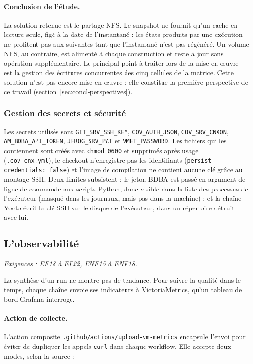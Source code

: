 \paragraph{Conclusion de l'étude.} La solution retenue est le partage NFS. Le
snapshot ne fournit qu'un cache en lecture seule, figé à la date de
l'instantané : les états produits par une exécution ne profitent pas aux
suivantes tant que l'instantané n'est pas régénéré. Un volume NFS, au contraire,
est alimenté à chaque construction et reste à jour sans opération
supplémentaire. Le principal point à traiter lors de la mise en œuvre est la
gestion des écritures concurrentes des cinq cellules de la matrice. Cette
solution n'est pas encore mise en œuvre ; elle constitue la première perspective
de ce travail (section~\ref{sec:concl-perspectives}).

\subsubsection{Gestion des secrets et sécurité}

Les secrets utilisés sont \texttt{GIT\_SRV\_SSH\_KEY}, \texttt{COV\_AUTH\_JSON},
\texttt{COV\_SRV\_CNXON}, \texttt{AM\_BDBA\_API\_TOKEN}, \texttt{JFROG\_SRV\_PAT} et
\texttt{VMET\_PASSWORD}. Les fichiers qui les contiennent sont créés avec
\texttt{chmod 0600} et supprimés après usage (\texttt{.cov\_cnx.yml}), le
checkout n'enregistre pas les identifiants (\texttt{persist-credentials: false})
et l'image de compilation ne contient aucune clé grâce au montage SSH. Deux
limites subsistent : le jeton BDBA est passé en argument de ligne de commande
aux scripts Python, donc visible dans la liste des processus de l'exécuteur
(masqué dans les journaux, mais pas dans la machine) ; et la chaîne Yocto écrit
la clé SSH sur le disque de l'exécuteur, dans un répertoire détruit avec lui.

\subsection{L'observabilité}
\label{ssec:impl-observabilite}

\emph{Exigences : EF18 à EF22, ENF15 à ENF18.}

La synthèse d'un run ne montre pas de tendance. Pour suivre la qualité dans le
temps, chaque chaîne envoie ses indicateurs à VictoriaMetrics, qu'un tableau de
bord Grafana interroge.

\paragraph{Action de collecte.} L'action composite
\texttt{.github/actions/upload-vm-metrics} encapsule l'envoi pour éviter de
dupliquer les appels \texttt{curl} dans chaque workflow. Elle accepte deux
modes, selon la source :

